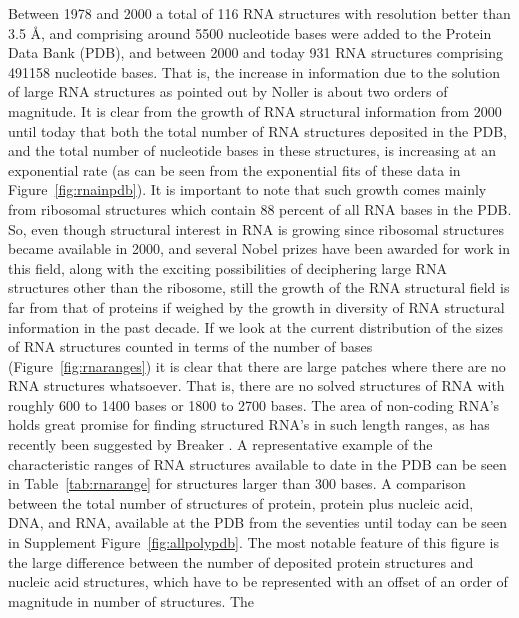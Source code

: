 \noindent Between  1978 and  2000 a total  of 116 RNA  structures with
resolution better than 3.5  \AA, and comprising around 5500 nucleotide
bases were added to the Protein  Data Bank (PDB), and between 2000 and
today  931  RNA  structures  comprising  491158  nucleotide
bases.  That  is, the increase in  information due to  the solution of
large  RNA structures as  pointed out  by Noller  \cite{noller2005} is
about two  orders of  magnitude. It  is clear from  the growth  of RNA
structural  information from  2000  until today  that  both the  total
number of RNA structures deposited in the PDB, and the total number of
nucleotide bases in these  structures, is increasing at an exponential
rate  (as can  be seen  from  the exponential  fits of  these data  in
Figure~\ref{fig:rnainpdb}).  It is important  to note that such growth
comes mainly from ribosomal structures which contain 88 percent of all
RNA bases in  the PDB.  So, even though structural  interest in RNA is
growing  since  ribosomal structures  became  available  in 2000,  and
several Nobel prizes  have been awarded for work  in this field, along
with   the   exciting   possibilities   of   deciphering   large   RNA
\cite{weinberg2009}  structures  other than  the  ribosome, still  the
growth of  the RNA structural  field is far  from that of  proteins if
weighed by  the growth in  diversity of RNA structural  information in
the past decade.  If we look  at the current distribution of the sizes
of  RNA   structures  counted  in   terms  of  the  number   of  bases
(Figure~\ref{fig:rnaranges}) it is clear  that there are large patches
where there are  no RNA structures whatsoever.  That  is, there are no
solved structures  of RNA with  roughly 600 to  1400 bases or  1800 to
2700  bases.  The  area of  non-coding RNA's  holds great  promise for
finding structured RNA's  in such length ranges, as  has recently been
suggested by Breaker \cite{weinberg2009}.  A representative example of
the characteristic ranges  of RNA structures available to  date in the
PDB can be seen in Table~\ref{tab:rnarange} for structures larger than
300  bases. A  comparison between  the total  number of  structures of
protein, protein plus nucleic acid, DNA, and RNA, available at the PDB
from   the  seventies   until  today   can  be   seen   in  Supplement
Figure~\ref{fig:allpolypdb}.  The most  notable feature of this figure
is  the  large difference  between  the  number  of deposited  protein
structures and  nucleic acid structures, which have  to be represented
with an offset  of an order of magnitude in  number of structures. The
